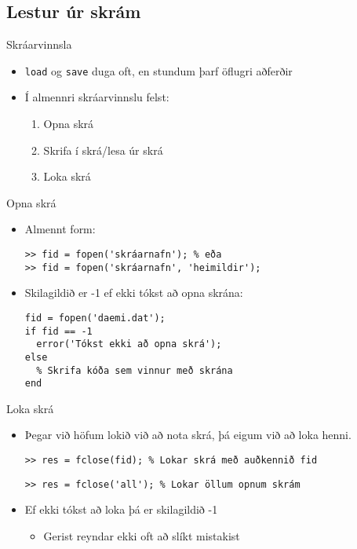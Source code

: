 \documentclass[handout]{beamer}
\begin{document}
\subsection{Lestur úr skrám}

\begin{frame}{Skráarvinnsla}
\begin{itemize}
 \item \texttt{load} og \texttt{save} duga oft, en stundum þarf öflugri aðferðir
 \item Í almennri skráarvinnslu felst:
 \begin{enumerate}
  \item Opna skrá
  \item Skrifa í skrá/lesa úr skrá
  \item Loka skrá
 \end{enumerate}
\end{itemize}
\end{frame}

\begin{frame}[fragile]{Opna skrá}
\begin{itemize}
 \item Almennt form:
\begin{verbatim}
>> fid = fopen('skráarnafn'); % eða
>> fid = fopen('skráarnafn', 'heimildir');
\end{verbatim}
 \item Skilagildið er -1 ef ekki tókst að opna skrána:
\begin{verbatim}
fid = fopen('daemi.dat');
if fid == -1
  error('Tókst ekki að opna skrá');
else
  % Skrifa kóða sem vinnur með skrána
end
\end{verbatim}
\end{itemize}
\end{frame}

\begin{frame}[fragile]{Loka skrá}
\begin{itemize}
 \item Þegar við höfum lokið við að nota skrá, þá eigum við að loka henni.
\begin{verbatim}
>> res = fclose(fid); % Lokar skrá með auðkennið fid
\end{verbatim}
\begin{verbatim}
>> res = fclose('all'); % Lokar öllum opnum skrám
\end{verbatim}
 \item Ef ekki tókst að loka þá er skilagildið -1
 \begin{itemize}
  \item Gerist reyndar ekki oft að slíkt mistakist
 \end{itemize}
\end{itemize}
\end{frame}
\end{document}
